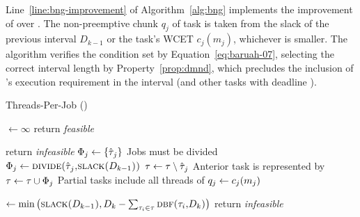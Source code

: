 \documentclass[a4paper,UKenglish,cleveref,autoref,english]{lipics-v2019}
\begin{document}
Line~\ref{line:bng-improvement} of Algorithm~\ref{alg:bng} implements
the improvement of \bng{} over \npchunks{}. The non-preemptive chunk 
${q_j}$ of task  is taken from the slack of the previous
interval ${D_{k-1}}$ or the task's WCET ${c_j(m_j)}$, whichever is
smaller. The algorithm verifies the condition set by
Equation~\ref{eq:baruah-07}, selecting the correct interval
length by Property~\ref{prop:dmnd}, which precludes the inclusion of
's execution requirement in the interval (and other tasks with
deadline ).

\begin{algorithm}[ht]
  \caption{Threads-Per-Job (\tpj{})}\label{alg:tpj}
  \begin{algorithmic}[1]
    \State {} ${\gets \infty}$
     \label{line:begin-for}
       \label{line:infeasible-1}
        \State return \emph{feasible}
      \EndIf
 
            \label{line:bnc-mod-start}
      \label{line:minq-start}
        \State return \emph{infeasible} \label{line:no-slack-infease}
        \EndIf \label{line:minq-end}
      \State ${\Phi_{j} \gets \{\hat{\tau_{}}_j\}}$
      \label{line:rem-p1}
        \Comment Jobs must be divided
          \State ${\Phi_{j} \gets \text{\sc{divide}(\ensuremath{\hat{\tau_{}}_j},\text{\sc{slack}(\ensuremath{D_{k-1}})})}}$
          \label{line:divide}
          \State ${\tau{} \gets \tau{} \setminus \hat{\tau_{}}_j}$
          \Comment Anterior task  is represented by 
          \State ${\tau{} \gets \tau{} \cup \Phi_{j}}$
          \Comment Partial tasks include all threads of 
      \EndIf \label{line:rem-p2}
          \State ${q_j \gets c_{j}{(m_j)}}$
      \EndFor
      \EndFor \label{line:the-same}
      \label{line:bnc-mod-end}
      
      \State {} ${\gets \min
        \left(
          \text{\sc{slack}(${D_{k-1}}$)}, D_k - \sum_{\tau_{i} \in \tau}
          \text{\sc{dbf}(\ensuremath{\tau_{i}},${D_k}$)}
        \right)
      }$ \label{line:same-deadline}
       \label{line:infeasible-2}
        \State return \emph{infeasible} \label{line:more-demand}
      \EndIf
    \EndFor
  \end{algorithmic}
\end{algorithm}
\end{document}
